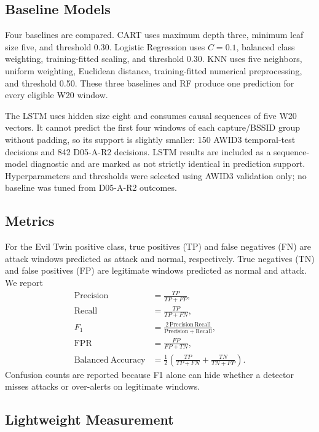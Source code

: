 \documentclass[conference]{IEEEtran}
\begin{document}
\subsection{Baseline Models}

Four baselines are compared. CART uses maximum depth three, minimum leaf size five, and threshold 0.30. Logistic Regression uses $C=0.1$, balanced class weighting, training-fitted scaling, and threshold 0.30. KNN uses five neighbors, uniform weighting, Euclidean distance, training-fitted numerical preprocessing, and threshold 0.50. These three baselines and RF produce one prediction for every eligible W20 window.

The LSTM uses hidden size eight and consumes causal sequences of five W20 vectors. It cannot predict the first four windows of each capture/BSSID group without padding, so its support is slightly smaller: 150 AWID3 temporal-test decisions and 842 D05-A-R2 decisions. LSTM results are included as a sequence-model diagnostic and are marked as not strictly identical in prediction support. Hyperparameters and thresholds were selected using AWID3 validation only; no baseline was tuned from D05-A-R2 outcomes.

\subsection{Metrics}

For the Evil Twin positive class, true positives (TP) and false negatives (FN) are attack windows predicted as attack and normal, respectively. True negatives (TN) and false positives (FP) are legitimate windows predicted as normal and attack. We report
\begin{align}
\mathrm{Precision} &= \frac{TP}{TP+FP},\\
\mathrm{Recall} &= \frac{TP}{TP+FN},\\
F_1 &= \frac{2\,\mathrm{Precision}\,\mathrm{Recall}}
{\mathrm{Precision}+\mathrm{Recall}},\\
\mathrm{FPR} &= \frac{FP}{FP+TN},\\
\mathrm{Balanced\ Accuracy} &= \frac{1}{2}\left(\frac{TP}{TP+FN}+\frac{TN}{TN+FP}\right).
\end{align}
Confusion counts are reported because F1 alone can hide whether a detector misses attacks or over-alerts on legitimate windows.

\subsection{Lightweight Measurement}
\end{document}
